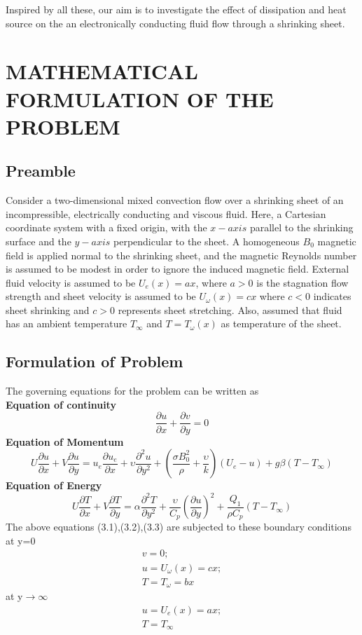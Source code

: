 \documentclass[a4paper,12pt]{report}
\begin{document}
{Inspired by all these, our aim is to investigate the effect of dissipation and heat source on the an electronically conducting fluid flow through a shrinking sheet. 
\chapter{MATHEMATICAL FORMULATION OF THE PROBLEM}
\section{Preamble}
Consider a two-dimensional mixed convection flow over a shrinking sheet of an incompressible, electrically conducting and viscous fluid. Here, a Cartesian coordinate system with a fixed origin, with the $x-axis$ parallel to the shrinking surface and the $y-axis$ perpendicular to the sheet. A homogeneous $B_0$ magnetic field is applied normal to the shrinking sheet, and the magnetic Reynolds number is assumed to be modest in order to ignore the induced magnetic field. External fluid velocity is assumed to be $U_e(x)=ax$, where $a>0$ is the stagnation flow strength and sheet velocity is assumed to be $U_\omega(x) = cx$ where $c<0$ indicates sheet shrinking and $c>0$ represents sheet stretching. Also, assumed that fluid has an ambient temperature $T_\infty$ and $T=T_\omega(x)$ as temperature of the sheet.
\section{Formulation of Problem}
The governing equations for the problem can be written as\\
\textbf{Equation of continuity}
\begin{equation}
	\frac{\partial u}{\partial x} + \frac{\partial v}{\partial y} = 0
\end{equation}  
\textbf{Equation of Momentum}
\begin{equation}
U\frac{\partial u}{\partial x}+V\frac{\partial u}{\partial y} = u_e\frac{\partial u_e}{\partial x}+\upsilon\frac{\partial^2 u}{\partial y^2}+(\frac{\sigma B_0^2}{\rho}+\frac{\upsilon}{k})(U_e-u)+g\beta(T-T_\infty)
\end{equation}
\textbf{Equation of Energy}
\begin{equation}
U\frac{\partial T}{\partial x}+V\frac{\partial T}{\partial y} = \alpha\frac{\partial^2 T}{\partial y^2}+\frac{\upsilon}{C_p}(\frac{\partial u}{\partial y})^2+\frac{Q_1}{\rho C_p}(T-T_\infty)
\end{equation}
The above equations (3.1),(3.2),(3.3) are subjected to these boundary conditions \\
at y=0
\begin{equation}
\begin{aligned}
		v = 0; \\
	u = U_\omega(x) = cx; \\
	T = T_\omega = bx
\end{aligned}
\end{equation}
at y$\longrightarrow$$\infty$
\begin{equation}
\begin{aligned}
	u = U_e(x) = ax; \\
	T = T_\infty
\end{aligned}
\end{equation}
}
\end{document}
